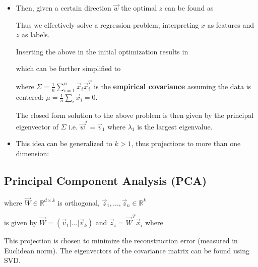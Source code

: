 \documentclass[10pt,a4paper]{scrartcl}
\begin{document}
\begin{multicols*}{2}
\begin{itemize}
\item Then, given a certain direction $\vec{w}$ the optimal $z$ can be found as


Thus we effectively solve a regression problem, interpreting $x$ as features and $z$ as labels.

Inserting the above in the initial optimization results in


which can be further simplified to


where $\Sigma=\frac{1}{n}\sum\limits_{i=1}^n\vec{x}_i\vec{x}_i^T$ is the \textbf{empirical covariance} assuming the data is centered: $\mu=\frac{1}{n}\sum\limits_i \vec{x}_i=0$.

\vspace{3ex}

The closed form solution to the above problem is then given by the principal eigenvector of $\Sigma$ i.e. $\vec{w}^\ast=\vec{v}_1$ where $\lambda_1$ is the largest eigenvalue.
\item This idea can be generalized to $k>1$, thus projections to more than one dimension:

\end{itemize}

\subsection{Principal Component Analysis (PCA)}


where $\vec{W}\in\mathbb{R}^{d\times k}$ is orthogonal, $\vec{z}_1,\ldots,\vec{z}_n\in\mathbb{R}^k$

is given by $\vec{W}=(\vec{v}_1|\ldots|\vec{v}_k)$ and $\vec{z}_i=\vec{W}^T\vec{x}_i$ where 


This projection is chosen to minimize the reconstruction error (measured in Euclidean norm). The eigenvectors of the covariance matrix can be found using SVD.


\end{multicols*}
\end{document}
